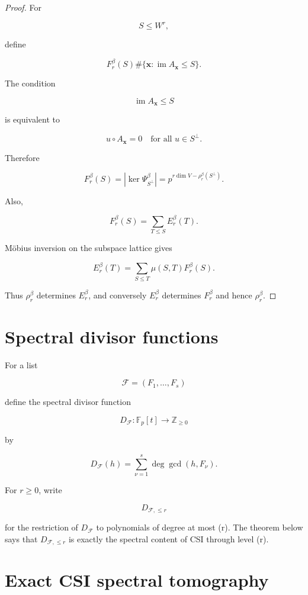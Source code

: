 \documentclass[11pt]{article}
\begin{document}
\begin{proof}
For

\[
S\le W^r,
\]

define

\[
F_r^\beta(S)
\#\{\mathbf x:\operatorname{im}A_{\mathbf x}\le S\}.
\]

The condition

\[
\operatorname{im}A_{\mathbf x}\le S
\]

is equivalent to

\[
u\circ A_{\mathbf x}=0
\quad
\text{for all }u\in S^\perp.
\]

Therefore

\[
F_r^\beta(S)
=|\ker \Psi_{S^\perp}^\beta|
=p^{r\dim V-\rho_r^\beta(S^\perp)}.
\tag{4.1}
\]

Also,

\[
F_r^\beta(S)=\sum_{T\le S}E_r^\beta(T).
\tag{4.2}
\]

Möbius inversion on the subspace lattice gives

\[
E_r^\beta(T)=
\sum_{S\le T}\mu(S,T)F_r^\beta(S).
\]

Thus $\rho_r^\beta$ determines $E_r^\beta$, and conversely $E_r^\beta$ determines $F_r^\beta$ and hence $\rho_r^\beta$.

\end{proof}

\section{Spectral divisor functions}

For a list

\[
\mathcal F=(F_1,\ldots,F_s)
\]

define the spectral divisor function

\[
D_{\mathcal F}:\mathbb F_p[t]\to\mathbb Z_{\ge0}
\]

by

\[
D_{\mathcal F}(h)
=\sum_{\nu=1}^s
\deg\gcd(h,F_\nu).
\tag{5.1}
\]

For $r\ge0$, write

\[
D_{\mathcal F,\le r}
\]

for the restriction of $D_{\mathcal F}$ to polynomials of degree at most (r). The theorem below says that $D_{\mathcal F,\le r}$ is exactly the spectral content of CSI through level (r).

\section{Exact CSI spectral tomography}
\end{document}
